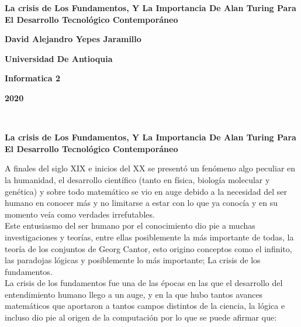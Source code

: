 \documentclass[12pt]{article}
\begin{document}
\begin{center}
\bf{\sc\Huge 
La crisis de Los Fundamentos, Y La Importancia De Alan Turing Para El Desarrollo Tecnológico Contemporáneo
}\\
\end{center}
\vspace{100pt}
\begin{center}
\bf{\sc\Huge David Alejandro Yepes Jaramillo }\\
\end{center}
\vspace{100pt}
\begin{center}
\bf{\sc\Huge Universidad De Antioquia}\\
\end{center}
\vspace{100pt}
\begin{center}
\bf{\sc\Huge Informatica 2}
\end{center}
\begin{center}
\bf{\sc\Huge 2020}\\
\end{center}\
\newpage



\begin{center}

\bf{\sc\Large La crisis de Los Fundamentos, Y La Importancia De Alan Turing Para El Desarrollo Tecnológico Contemporáneo }\\
\end{center}



A finales del siglo XIX e inicios del XX se presentó un fenómeno algo peculiar en la humanidad, el desarrollo científico (tanto en física, biología molecular y genética) y sobre todo matemático se vio en auge debido a la necesidad del ser humano en conocer más y no limitarse a estar con lo que ya conocía y en su momento veía como verdades irrefutables.\\
Este entusiasmo del ser humano por el conocimiento dio pie a muchas investigaciones y teorías, entre ellas posiblemente la más importante de todas, la teoría de los conjuntos de Georg Cantor, esto origino conceptos como el infinito, las paradojas lógicas y posiblemente lo más importante; La crisis de los fundamentos.\\

La crisis de los fundamentos fue una de las épocas en las que el desarrollo del entendimiento humano llego a un auge, y en la que hubo tantos avances matemáticos que aportaron a tantos campos distintos de la ciencia, la lógica e incluso dio pie al origen de la computación por lo que se puede afirmar que:\\
\end{document}
